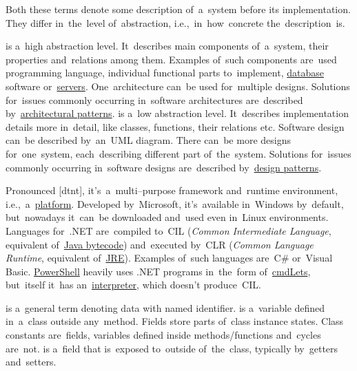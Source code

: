 \label{architecturedesign}
Both these terms denote some description of~a~system before its implementation.
They differ in~the~level of~abstraction, i.e.,~in~how~concrete the~description~is.
\begin{itemize}
     is a~high abstraction level.
            It~describes main components of~a~system, their properties and~relations among them.
            Examples of~such components are~used programming language, individual functional parts to~implement, \hyperref[databases]{database} software or~\hyperref[server]{servers}.
          One~architecture can~be used for~multiple designs.
          Solutions for~issues commonly occurring in~software architectures are~described by~\hyperref[architecturalpatterns]{architectural patterns}.
     is a~low abstraction level.
            It~describes implementation details more in~detail, like classes, functions, their relations etc.
            Software design can~be described by~an~UML diagram.
            There can~be more designs for~one~system, each~describing different part of~the~system.
            Solutions for~issues commonly occurring in~software designs are~described by~\hyperref[designpatterns]{design patterns}.
\end{itemize}

\label{dotnet}
Pronounced [d\textopeno{}tn\textepsilon{}t], it's~a~multi--purpose framework and~runtime environment, i.e.,~a~\hyperref[platform]{platform}.
Developed by~Microsoft, it's~available in~Windows by~default, but~nowadays it~can~be downloaded and~used even in~Linux environments.
Languages \mbox{for~.NET} are~compiled to~CIL (\textit{Common Intermediate Language}, equivalent of~\hyperref[bytecode]{Java bytecode}) and~executed by~CLR (\textit{Common Language Runtime}, equivalent of~\hyperref[jdkjrejvm]{JRE}).
Examples of~such languages are~C\# or~Visual Basic.
\hyperref[powershell]{PowerShell} heavily uses .NET programs in~the~form of~\hyperref[cmdlet]{cmdLets}, but~itself it~has an~\hyperref[compiledinterpretedlanguages]{interpreter}, which doesn't produce~CIL\@.

\label{variablefieldproperty}
\begin{itemize}
     is a~general term denoting data with named identifier.
     is a~variable defined in~a~class outside any~method.
            Fields store parts of~class instance states.
            Class constants are~fields, variables defined inside \mbox{methods/functions} and~cycles are~not.
     is a~field that is~exposed to~outside of~the~class, typically by~getters and~setters.
\end{itemize}

